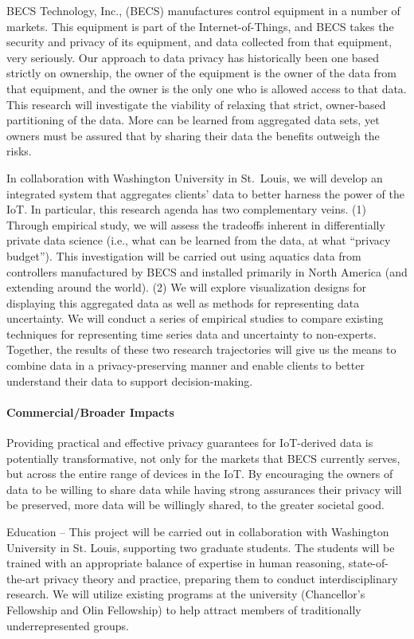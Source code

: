 BECS Technology, Inc., (BECS) manufactures control equipment in a
number of markets.
This equipment is part of the Internet-of-Things, and BECS takes the
security and privacy of its equipment, and data collected from that
equipment, very seriously.
Our approach to data privacy has historically been one based strictly 
on ownership, the owner of the equipment is the owner of the data from
that equipment, and the owner is the only one who is allowed access to
that data.
This research will investigate the viability of relaxing that strict,
owner-based partitioning of the data.  More can be learned from aggregated
data sets, yet owners must be assured that by sharing their data the
benefits outweigh the risks.

In collaboration with Washington University in St.~Louis, we will develop an integrated system that aggregates clients' data to better harness the power of the IoT.  
In particular, this research agenda has two complementary veins. (1) 
Through empirical study,
we will assess the tradeoffs inherent in differentially private 
data science (i.e., what can be learned from the data, at what ``privacy
budget'').
This investigation will be carried out using aquatics data from
controllers manufactured by BECS and installed primarily in North America
(and extending around the world).
(2) We will explore visualization designs for displaying this aggregated data as well as methods for representing data uncertainty. 
We will conduct a series of empirical studies to compare existing techniques for representing time series data and uncertainty to non-experts. 
Together, the results of these two research trajectories will give us the means to combine data in a privacy-preserving manner and enable clients to better understand their data to support decision-making.  



\medskip

\paragraph{Commercial/Broader Impacts}
Providing practical and effective privacy guarantees for IoT-derived data
is potentially transformative, not only for the markets that BECS currently
serves, but across the entire range of devices in the IoT.
By encouraging the owners of data to be willing to share data while having
strong assurances their privacy will be preserved, more data will be
willingly shared, to the greater societal good.

Education -- This project will be carried out in collaboration with
Washington University in St. Louis, supporting two graduate students.
The students will be trained with an appropriate balance of expertise in human reasoning, state-of-the-art privacy theory and practice, preparing them to conduct interdisciplinary research.
We will utilize existing programs at the university (Chancellor's
Fellowship and Olin Fellowship) to help attract members of traditionally
underrepresented groups.
